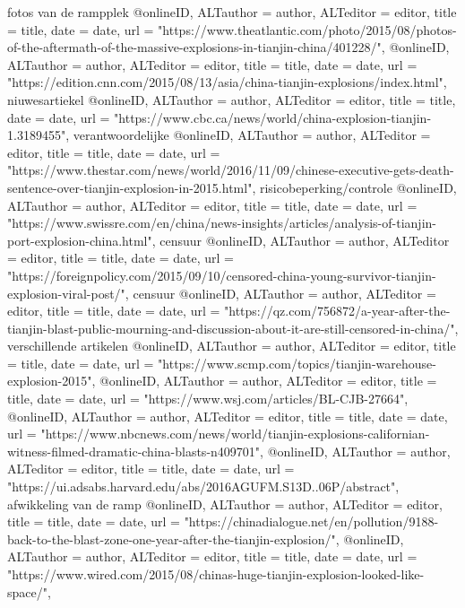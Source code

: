 {{{{{{{{fotos van de rampplek
@online{ID,	ALTauthor = {author},	ALTeditor = {editor},	title = {title},	date = {date},	url = {"https://www.theatlantic.com/photo/2015/08/photos-of-the-aftermath-of-the-massive-explosions-in-tianjin-china/401228/"},}
@online{ID,	ALTauthor = {author},	ALTeditor = {editor},	title = {title},	date = {date},	url = {"https://edition.cnn.com/2015/08/13/asia/china-tianjin-explosions/index.html"},}
niuwesartiekel}
@online{ID,	ALTauthor = {author},	ALTeditor = {editor},	title = {title},	date = {date},	url = {"https://www.cbc.ca/news/world/china-explosion-tianjin-1.3189455"},}
verantwoordelijke
@online{ID,	ALTauthor = {author},	ALTeditor = {editor},	title = {title},	date = {date},	url = {"https://www.thestar.com/news/world/2016/11/09/chinese-executive-gets-death-sentence-over-tianjin-explosion-in-2015.html"},}
risicobeperking/controle
@online{ID,	ALTauthor = {author},	ALTeditor = {editor},	title = {title},	date = {date},	url = {"https://www.swissre.com/en/china/news-insights/articles/analysis-of-tianjin-port-explosion-china.html"},}
censuur
@online{ID,	ALTauthor = {author},	ALTeditor = {editor},	title = {title},	date = {date},	url = {"https://foreignpolicy.com/2015/09/10/censored-china-young-survivor-tianjin-explosion-viral-post/"},}
censuur
@online{ID,	ALTauthor = {author},	ALTeditor = {editor},	title = {title},	date = {date},	url = {"https://qz.com/756872/a-year-after-the-tianjin-blast-public-mourning-and-discussion-about-it-are-still-censored-in-china/"},}
verschillende artikelen
@online{ID,	ALTauthor = {author},	ALTeditor = {editor},	title = {title},	date = {date},	url = {"https://www.scmp.com/topics/tianjin-warehouse-explosion-2015"},}
@online{ID,	ALTauthor = {author},	ALTeditor = {editor},	title = {title},	date = {date},	url = {"https://www.wsj.com/articles/BL-CJB-27664"},}
@online{ID,	ALTauthor = {author},	ALTeditor = {editor},	title = {title},	date = {date},	url = {"https://www.nbcnews.com/news/world/tianjin-explosions-californian-witness-filmed-dramatic-china-blasts-n409701"},}
@online{ID,	ALTauthor = {author},	ALTeditor = {editor},	title = {title},	date = {date},	url = {"https://ui.adsabs.harvard.edu/abs/2016AGUFM.S13D..06P/abstract"},}
afwikkeling van de ramp
@online{ID,	ALTauthor = {author},	ALTeditor = {editor},	title = {title},	date = {date},	url = {"https://chinadialogue.net/en/pollution/9188-back-to-the-blast-zone-one-year-after-the-tianjin-explosion/"},}
@online{ID,	ALTauthor = {author},	ALTeditor = {editor},	title = {title},	date = {date},	url = {"https://www.wired.com/2015/08/chinas-huge-tianjin-explosion-looked-like-space/"},}
}}}}}}}
